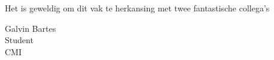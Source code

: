 Het is geweldig om dit vak te herkansing met twee fantastische collega's

\vskip 1in

\noindent
Galvin Bartes\\
Student\\
CMI